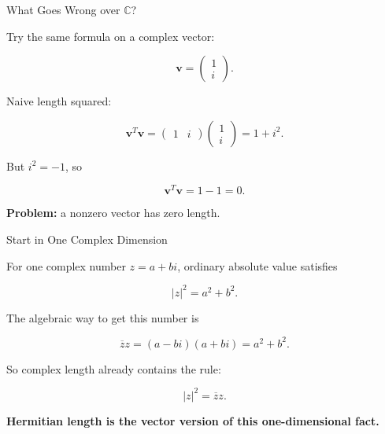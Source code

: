 \documentclass[10pt]{beamer}
\theoremstyle{definition}
\newcommand{\x}[1]{\alert{\textbf{#1}}}
\begin{document}
\begin{frame}{What Goes Wrong over $\mathbb{C}$?}

Try the same formula on a complex vector:

$$
\mathbf{v}=\begin{pmatrix}1\\ i\end{pmatrix}.
$$

\vfill\pause

Naive length squared:

$$
\mathbf{v}^T\mathbf{v}
=\begin{pmatrix}1&i\end{pmatrix}
\begin{pmatrix}1\\ i\end{pmatrix}
=1+i^2.
$$

\vfill\pause

But $i^2=-1$, so

$$
\mathbf{v}^T\mathbf{v}=1-1=0.
$$

\vfill

\x{Problem:} a nonzero vector has zero length.

\end{frame}


\begin{frame}{Start in One Complex Dimension}

For one complex number $z=a+bi$, ordinary absolute value satisfies

$$
|z|^2=a^2+b^2.
$$

\vfill\pause

The algebraic way to get this number is

$$
\overline{z}z=(a-bi)(a+bi)=a^2+b^2.
$$

\vfill\pause

So complex length already contains the rule:

$$
\boxed{|z|^2=\overline{z}z.}
$$

\vfill

\x{Hermitian length is the vector version of this one-dimensional fact.}

\end{frame}
\end{document}
